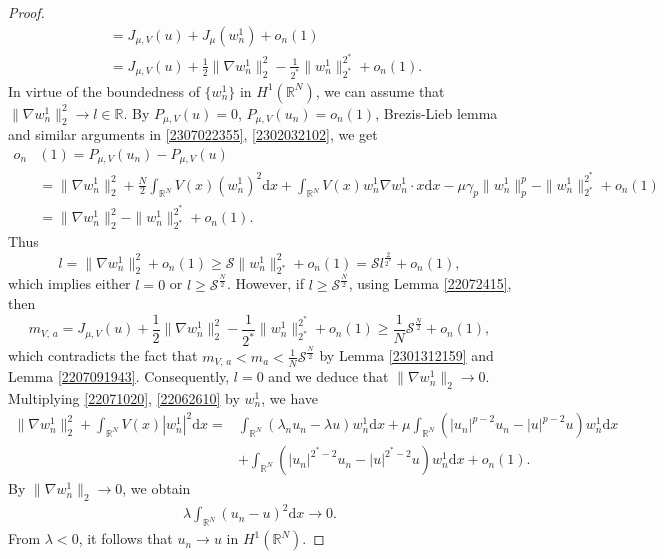 \documentclass[10pt]{article}
\numberwithin{equation}{section}
\newcommand{\ud}{\mathrm{d}}
\numberwithin{equation}{section}
\begin{document}
\begin{proof}
\[\begin{aligned}
&=J_{\mu, V}(u)+J_{\mu}(w_n^1)+o_n(1)\\
&=J_{\mu, V}(u)+\frac12 \|\nabla w^1_n\|_2^2-\frac{1}{2^*}\|w_n^1\|_{2^*}^{2^*}+o_n(1).
\end{aligned}
\]
In virtue of the boundedness of $\{w^1_n\}$ in $H^1(\mathbb{R}^N)$, we can assume that $\|\nabla w^1_n\|_2^2\rightarrow l\in\mathbb{R}$. By $P_{\mu, V}(u)=0$, $P_{\mu, V}(u_n)=o_n(1)$, Brezis-Lieb lemma and similar arguments in \eqref{2307022355}, \eqref{2302032102}, we get
\begin{equation*}
\begin{aligned}
  o_n&(1)=P_{\mu, V}(u_n)-P_{\mu, V}(u)\\
  &=\|\nabla w_n^1\|_2^2
+\frac{N}{2}\int_{\mathbb{R}^N}V(x)(w_n^1)^2 \ud x +\int_{\mathbb{R}^N}V(x)w_n^1\nabla w_n^1\cdot x \ud x-\mu\gamma_p\|w^1_n\|_p^p
-\|w^1_n\|_{2^*}^{2^*}+o_n(1)\\
&=\|\nabla w_n^1\|_2^2-\|w^1_n\|_{2^*}^{2^*}+o_n(1).
\end{aligned}
\end{equation*}
Thus
\begin{equation*}
l=\|\nabla w^1_n\|_2^2+o_n(1)\ge \mathcal{S}\|w^1_n\|_{2^*}^{2}+o_n(1)=\mathcal{S}l^{\frac{2}{2^*}}+o_n(1),
\end{equation*}
which implies either $l=0$ or $l\ge\mathcal{S}^{\frac{N}{2}}$.
However, if $l\ge \mathcal{S}^{\frac{N}{2}}$, using Lemma \ref{22072415}, then
$${m}_{V,\, a}=J_{\mu, V}(u)+\frac12 \|\nabla w^1_n\|_2^2-\frac{1}{2^*}\|w^1_n\|_{2^*}^{2^*}+o_n(1)\ge \frac{1}{N}\mathcal{S}^{\frac{N}{2}}+o_n(1),$$ which contradicts the fact that ${m}_{V,\, a} <m_a<\frac{1}{N}\mathcal{S}^{\frac{N}{2}}$ by Lemma \ref{2301312159} and Lemma \ref{2207091943}. Consequently, $l=0$ and we deduce that $\|\nabla w^1_n\|_2\rightarrow 0$. Multiplying \eqref{22071020}, \eqref{22062610} by $w^1_n$, we have
\[
\begin{aligned}
\|\nabla w^1_n\|_2^2+\int_{\mathbb{R}^N}V(x)|w^1_n|^2 \ud x=&\int_{\mathbb{R}^N}(\lambda_n u_n- \lambda u)w^1_n \ud x+\mu\int_{\mathbb{R}^N}(|u_n|^{p-2}u_n- |u|^{p-2}u)w^1_n \ud x\\
&+\int_{\mathbb{R}^N}(|u_n|^{2^*-2}u_n- |u|^{2^*-2}u)w^1_n \ud x+o_n(1).
\end{aligned}
\]
By $\|\nabla w^1_n\|_2\rightarrow 0$, we obtain
\[
\begin{aligned}
\lambda \int_{\mathbb{R}^N}(u_n-u)^2 \ud x \rightarrow 0.
\end{aligned}
\]
From $\lambda<0$, it follows that $u_n\rightarrow u$ in $H^1(\mathbb{R}^N)$.

\end{proof}
\end{document}
